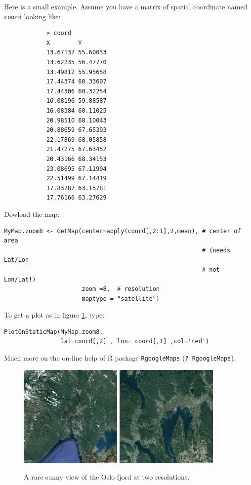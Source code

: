 \documentclass[a4paper,10pt]{article}
\begin{document}
Here is a small example. Assume you have a matrix of spatial coordinate named {\tt coord} looking like:\\

\begin{verbatim}
            > coord
            X        Y
            13.67137 55.60033
            13.62235 56.47770
            13.49812 55.95658
            17.44374 60.33607
            17.44306 60.32254
            16.08196 59.88587
            16.08384 60.11025
            20.98510 68.10043
            20.88659 67.65393
            22.17869 68.05858
            21.47275 67.63452
            20.43166 68.34153
            23.08695 67.11904
            22.51499 67.14419
            17.83787 63.15781
            17.76166 63.27629
\end{verbatim}



 
\medskip
Dowload the map:

\begin{verbatim}
MyMap.zoom8 <- GetMap(center=apply(coord[,2:1],2,mean), # center of area 
                                                        # (needs Lat/Lon 
                                                        # not Lon/Lat!)
                      zoom =8,  # resolution
                      maptype = "satellite")
\end{verbatim}


\medskip
To get a plot as in figure \ref{fig:Oslo_fjord}, type:

\begin{verbatim}
PlotOnStaticMap(MyMap.zoom8,
                lat=coord[,2] , lon= coord[,1] ,col='red')
\end{verbatim}


\medskip
Much more on the on-line help of R package {\tt RgoogleMaps} ({\tt ? RgoogleMaps}).

\begin{figure}[h]
\hspace{2cm}\includegraphics[width=5cm]{./fig/MyMap_zoom7.jpeg} \hspace{1cm}\includegraphics[width=5cm]{./fig/MyMap_zoom10.jpeg}
\caption{A rare sunny view of the Oslo fjord at two resolutions.}\label{fig:Oslo_fjord}
\end{figure}
\end{document}
